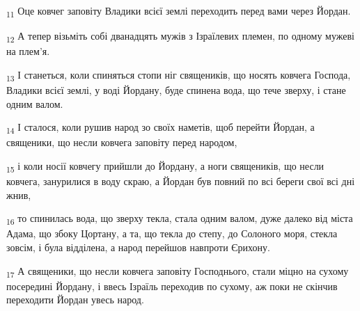 \begin{tcolorbox}
\textsubscript{11} Оце ковчег заповіту Владики всієї землі переходить перед вами через Йордан.
\end{tcolorbox}
\begin{tcolorbox}
\textsubscript{12} А тепер візьміть собі дванадцять мужів з Ізраїлевих племен, по одному мужеві на плем'я.
\end{tcolorbox}
\begin{tcolorbox}
\textsubscript{13} І станеться, коли спиняться стопи ніг священиків, що носять ковчега Господа, Владики всієї землі, у воді Йордану, буде спинена вода, що тече зверху, і стане одним валом.
\end{tcolorbox}
\begin{tcolorbox}
\textsubscript{14} І сталося, коли рушив народ зо своїх наметів, щоб перейти Йордан, а священики, що несли ковчега заповіту перед народом,
\end{tcolorbox}
\begin{tcolorbox}
\textsubscript{15} і коли носії ковчегу прийшли до Йордану, а ноги священиків, що несли ковчега, занурилися в воду скраю, а Йордан був повний по всі береги свої всі дні жнив,
\end{tcolorbox}
\begin{tcolorbox}
\textsubscript{16} то спинилась вода, що зверху текла, стала одним валом, дуже далеко від міста Адама, що збоку Цортану, а та, що текла до степу, до Солоного моря, стекла зовсім, і була відділена, а народ перейшов навпроти Єрихону.
\end{tcolorbox}
\begin{tcolorbox}
\textsubscript{17} А священики, що несли ковчега заповіту Господнього, стали міцно на сухому посередині Йордану, і ввесь Ізраїль переходив по сухому, аж поки не скінчив переходити Йордан увесь народ.
\end{tcolorbox}
